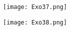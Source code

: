 \documentclass{article}
\title{}
\date{}
\author{}
\begin{document}
\begin{center}
\texttt{[image: Exo37.png]}

\vspace*{1cm}
\texttt{[image: Exo38.png]}
\end{center}
\end{document}
